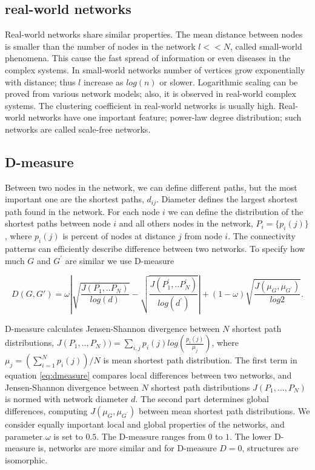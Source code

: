 \subsection{real-world networks}
Real-world networks share similar properties. The mean distance between nodes is smaller than the number of nodes in the network $l << N$, called small-world phenomena. This cause the fast spread of information or even diseases in the complex systems. In small-world networks number of vertices grow exponentially with distance; thus $l$ increase as $log(n)$ or slower. Logarithmic scaling can be proved from various network models; also, it is observed in real-world complex systems. The clustering coefficient in real-world networks is usually high. Real-world networks have one important feature; power-law degree distribution; such networks are called scale-free networks.

\subsection{D-measure}

Between two nodes in the network, we can define different paths, but the most important one are the shortest paths, $d_{ij}$. Diameter defines the largest shortest path found in the network. For each node $i$ we can define the distribution of the shortest paths between node $i$ and all others nodes in the network, $P_{i}=\{p_{i}(j)\}$, where $p_{i}(j)$ is percent of nodes at distance $j$ from node $i$. The connectivity patterns can efficiently describe difference between two networks.    
To specify how much $G$ and $G^{'}$ are similar we use D-measure \cite{tiago2}

\begin{equation} 
\label{eq:dmeasure}
D(G,G') = \omega \left| \sqrt{\frac{J(P_1,..P_N)}{log(d)}}-\sqrt{\frac{J(P_1^{'},..P_N^{'})}{log(d^{'})}} \right| \nonumber +  (1-\omega) \sqrt{\frac{J(\mu_{G},\mu_{G^{'}})}{log2}}.
\end{equation}

D-measure calculates Jensen-Shannon divergence between $N$ shortest path distributions, $J(P_1,.., P_N)) = \sum_{i,j}p_i(j)log(\frac{p_i(j)}{\mu_j})$, where  $\mu_j = (\sum_{i=1}^N p_i(j))/N$ is mean shortest path distribution. The first term in equation \ref{eq:dmeasure} compares local differences between two networks, and Jensen-Shannon divergence between $N$ shortest path distributions $J(P_{1},...,P_{N})$ is normed with network diameter $d$. The second part determines global differences, computing  ${J(\mu_{G},\mu_{G^{'}})}$ between mean shortest path distributions. We consider equally important local and global properties of the networks, and parameter $\omega$ is set to $0.5$. The D-measure ranges from $0$ to $1$. The lower D-measure is, networks are more similar and for D-measure $D = 0$, structures are isomorphic.






